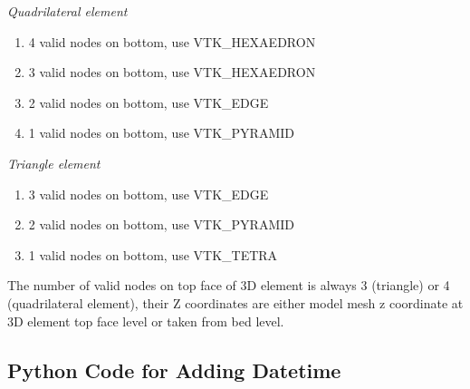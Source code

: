 \documentclass[12pt]{report}
\begin{document}
\emph{Quadrilateral element}

\begin{enumerate}
\item  4 valid nodes on bottom, use VTK\_HEXAEDRON 
\item  3 valid nodes on bottom, use VTK\_HEXAEDRON
\item  2 valid nodes on bottom, use VTK\_EDGE
\item  1 valid nodes on bottom, use VTK\_PYRAMID
\end{enumerate}


\emph{Triangle element}

\begin{enumerate}
\item  3 valid nodes on bottom, use VTK\_EDGE
\item  2 valid nodes on bottom, use VTK\_PYRAMID
\item  1 valid nodes on bottom, use VTK\_TETRA
\end{enumerate}


  The number of valid nodes on top face of 3D element is always 3 (triangle) or 4 (quadrilateral element), their Z coordinates are either model mesh z coordinate at 3D element top face level or taken from bed level.  
		 
\clearpage
\begin{appendices}
 \chapter{Python Code for Adding Datetime}\label{append:stampImages}
 \begin{Code}
 \centering
 
 \end{Code}
\end{appendices}
\end{document}
